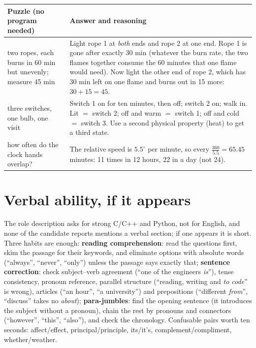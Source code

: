 \documentclass[10pt,a4paper,openany,oneside]{report}
\newcommand{\prio}[1]{\texorpdfstring{\ifcase#1\or{\color{gold}\ding{72}}\or{\color{gold}\ding{72}\ding{72}}\or{\color{gold}\ding{72}\ding{72}\ding{72}}\fi}{}}
\begin{document}
\begin{center}\small
\begin{xltabular}{\textwidth}{@{}L{3.3cm}Y@{}}
\toprule
\textbf{Puzzle (no program needed)} & \textbf{Answer and reasoning}\\
\midrule\endhead
two ropes, each burns in 60 min but unevenly; measure 45 min & Light rope 1 at \emph{both} ends and rope 2 at one end. Rope 1 is gone after exactly 30 min (whatever the burn rate, the two flames together consume the 60 minutes that one flame would need). Now light the other end of rope 2, which has 30 min left on one flame and burns out in 15 more: $30+15=45$.\\
three switches, one bulb, one visit & Switch 1 on for ten minutes, then off; switch 2 on; walk in. Lit $=$ switch 2; off and warm $=$ switch 1; off and cold $=$ switch 3. Use a second physical property (heat) to get a third state.\\
how often do the clock hands overlap? & The relative speed is $5.5^\circ$ per minute, so every $\frac{360}{5.5}=65.45$ minutes: 11 times in 12 hours, 22 in a day (not 24).\\
\bottomrule
\end{xltabular}
\end{center}

\section{Verbal ability, if it appears \prio{1}}
The role description asks for strong C/C++ and Python, not for English, and none of the candidate reports mentions a verbal section; if one appears it is short. Three habits are enough: \textbf{reading comprehension}: read the questions first, skim the passage for their keywords, and eliminate options with absolute words (``always'', ``never'', ``only'') unless the passage says exactly that; \textbf{sentence correction}: check subject--verb agreement (``one of the engineers \emph{is}''), tense consistency, pronoun reference, parallel structure (``reading, writing and \emph{to code}'' is wrong), articles (``an hour'', ``a university'') and prepositions (``different \emph{from}'', ``discuss'' takes no \emph{about}); \textbf{para-jumbles}: find the opening sentence (it introduces the subject without a pronoun), chain the rest by pronouns and connectors (``however'', ``this'', ``also''), and check the chronology. Confusable pairs worth ten seconds: affect/effect, principal/principle, its/it's, complement/compliment, whether/weather.
\end{document}
